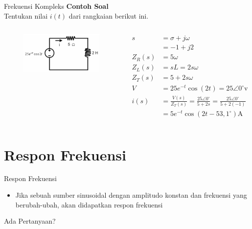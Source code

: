\documentclass[10pt]{beamer}
\begin{document}
\begin{frame}{Frekuensi Kompleks}
    \textbf{Contoh Soal} \\
    Tentukan nilai $i(t)$ dari rangkaian berikut ini.
    \begin{columns}
            \begin{figure}[]
                \centering
                \includegraphics[width=0.8\linewidth]{contoh1.png}
                \caption{}
                \label{}
            \end{figure}

            \begin{align*}
                s       &= \sigma + j \omega \\
                        &= -1 + j2 \\
                Z_R(s)  &= 5 \omega \\
                Z_L(s)  &= sL = 2s \omega \\
                Z_T(s)  &= 5 + 2s \omega \\
                V       &= 25 e^{-t} \cos(2t) = 25 \angle 0^{\circ} \text{v} \\
                i(s)    &= \frac{V(s)}{Z_T(s)} = \frac{25 \angle 0^{\circ}}{5 + 2s} = \frac{25 \angle 0^{\circ}}{5+2(-1)} \\
                        &= 5e^{-t} \cos(2t - 53,1^{\circ}) \text{A}
            \end{align*}
    \end{columns}
\end{frame}

\section{Respon Frekuensi}

\begin{frame}{Respon Frekuensi}
    \begin{itemize}
        \item Jika sebuah sumber sinusoidal dengan amplitudo konstan dan frekuensi yang berubah-ubah, akan didapatkan \alert{respon frekuensi}
    \end{itemize}
\end{frame}
\begin{frame}[standout]
    Ada Pertanyaan?
\end{frame}
  
\appendix
  
\end{document}
